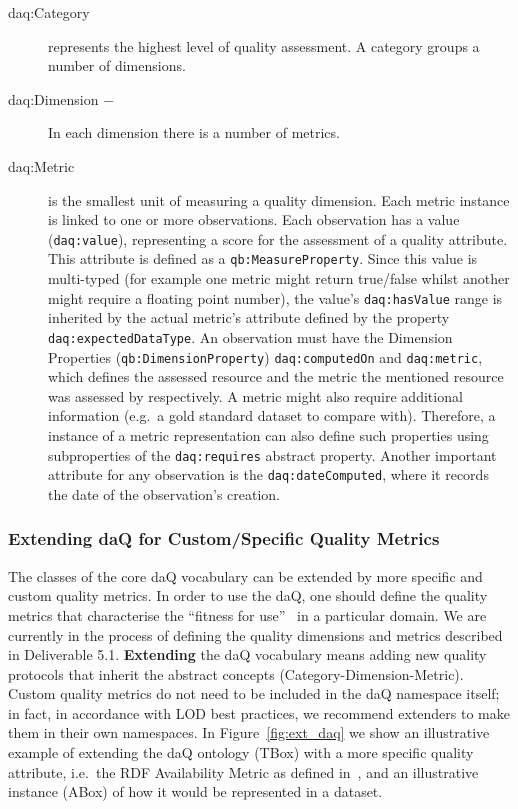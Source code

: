 \begin{description}
\item[daq:Category] represents the highest level of quality assessment.
  A category groups a number of dimensions.
\item[daq:Dimension $-$] In each dimension there is a number of metrics.
\item[daq:Metric] is the smallest unit of measuring a quality dimension.
  Each metric instance is linked to one or more observations. 
  Each observation has a value (\texttt{daq:value}), representing a score for the assessment of a quality attribute.
  This attribute is defined as a \texttt{qb:MeasureProperty}.
   Since this value is multi-typed (for example one metric might return true/false whilst another might require a floating point number), the value's \texttt{daq:hasValue} range is inherited by the actual metric's attribute defined by the property \texttt{daq:expectedDataType}.
  An observation must have the Dimension Properties (\texttt{qb:DimensionProperty}) \texttt{daq:computedOn} and \texttt{daq:metric}, which defines the assessed resource and the metric the mentioned resource was assessed by respectively.
  A metric might also require additional information (e.g.\ a gold standard dataset to compare with).
  Therefore, a instance of a metric representation can also define such properties using subproperties of the \texttt{daq:requires} abstract property.
  Another important attribute for any observation is the \texttt{daq:dateComputed}, where it records the date of the observation's creation.
\end{description}

\subsubsection{Extending daQ for Custom/Specific Quality Metrics}
\label{sec:extendingDAQ}
The classes of the core daQ vocabulary can be extended by more specific and custom quality metrics. 
In order to use the daQ, one should define the quality metrics that characterise the ``fitness for use''~\cite{Juran1974:biblatex} in a particular domain.
We are currently in the process of defining the quality dimensions and metrics described in Deliverable 5.1.
\textbf{Extending} the daQ vocabulary means adding new quality protocols that inherit the abstract concepts (Category-Dimension-Metric).
Custom quality metrics do not need to be included in the daQ namespace itself; in fact, in accordance with LOD best practices, we recommend extenders to make them in their own namespaces.
In Figure~\ref{fig:ext_daq} we show an illustrative example of extending the daQ ontology (TBox) with a more specific quality attribute, i.e.\ the RDF Availability Metric as defined in~\cite{Zaveri2012:LODQ}, and an illustrative instance (ABox) of how it would be represented in a dataset.

